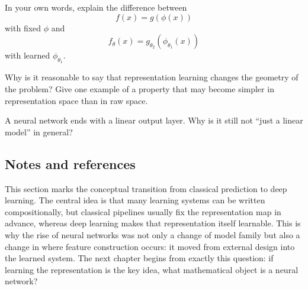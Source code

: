 \begin{exercise}
In your own words, explain the difference between
\[
f(x)=g(\phi(x))
\]
with fixed $\phi$ and
\[
f_\theta(x)=g_{\theta_2}(\phi_{\theta_1}(x))
\]
with learned $\phi_{\theta_1}$.
\end{exercise}

\begin{exercise}
Why is it reasonable to say that representation learning changes the geometry of the problem? Give one example of a property that may become simpler in representation space than in raw space.
\end{exercise}

\begin{exercise}
A neural network ends with a linear output layer. Why is it still not ``just a linear model'' in general?
\end{exercise}

\subsection*{Notes and references}

This section marks the conceptual transition from classical prediction to deep learning. The central idea is that many learning systems can be written compositionally, but classical pipelines usually fix the representation map in advance, whereas deep learning makes that representation itself learnable. This is why the rise of neural networks was not only a change of model family but also a change in where feature construction occurs: it moved from external design into the learned system. The next chapter begins from exactly this question: if learning the representation is the key idea, what mathematical object is a neural network?